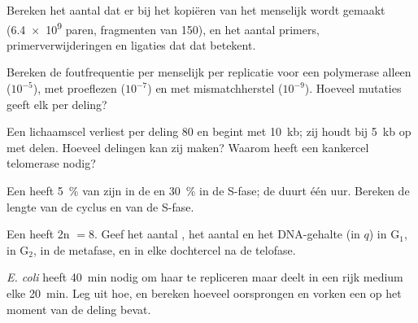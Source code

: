 \begin{exercise}[$\star\star$]\label{exo:b1:replication-mitosis:5}
Bereken het aantal  dat er bij het kopiëren van het menselijk
 wordt gemaakt (\num{6.4e9} paren, fragmenten van \qty{150}{}), en het aantal
primers, primerverwijderingen en ligaties dat dat betekent.
\end{exercise}

\begin{exercise}[$\star\star$]\label{exo:b1:replication-mitosis:6}
Bereken de foutfrequentie per menselijk  per replicatie voor een polymerase
alleen ($10^{-5}$), met proeflezen ($10^{-7}$) en met mismatchherstel ($10^{-9}$).
Hoeveel mutaties geeft elk per deling?
\end{exercise}

\begin{exercise}[$\star\star$]\label{exo:b1:replication-mitosis:7}
Een lichaamscel verliest per deling \qty{80}{}   en begint met
\qty{10}{kb}; zij houdt bij \qty{5}{kb} op met delen. Hoeveel delingen kan zij
maken? Waarom heeft een kankercel telomerase nodig?
\end{exercise}

\begin{exercise}[$\star\star$]\label{exo:b1:replication-mitosis:8}
Een  heeft \qty{5}{\%} van zijn  in de  en \qty{30}{\%} in de
S-fase; de  duurt één uur. Bereken de lengte van de cyclus en van de S-fase.
\end{exercise}

\begin{exercise}[$\star\star$]\label{exo:b1:replication-mitosis:9}
Een  heeft 2n $= 8$. Geef het aantal , het aantal  en het
DNA-gehalte (in $q$) in G$_1$, in G$_2$, in de metafase, en in elke dochtercel na
de telofase.
\end{exercise}

\begin{exercise}[$\star\star\star$]\label{exo:b1:replication-mitosis:10}
\emph{E. coli} heeft \qty{40}{min} nodig om haar  te repliceren maar
deelt in een rijk medium elke \qty{20}{min}. Leg uit hoe, en bereken hoeveel
oorsprongen en vorken een  op het moment van de deling bevat.
\end{exercise}

